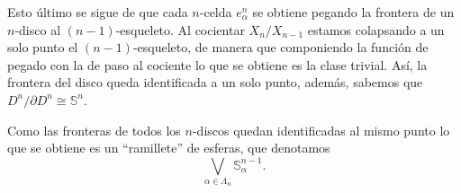 Esto último se sigue de que cada $n$-celda $e_{\alpha}^n$ se obtiene pegando la frontera de un $n$-disco al $(n-1)$-esqueleto. Al cocientar $X_n/X_{n-1}$ estamos colapsando a un solo punto el $(n-1)$-esqueleto, de manera que componiendo la función de pegado con la de paso al cociente lo que se obtiene es la clase trivial. Así, la frontera del disco queda identificada a un solo punto, además, sabemos que $D^n/\partial D^n \cong \mathbb{S}^n$.

Como las fronteras de todos los  $n$-discos quedan identificadas al mismo punto lo que se obtiene es un ``ramillete'' de esferas, que denotamos
\begin{equation*}
    \bigvee_{\alpha\in\Lambda_n} \mathbb{S}^{n-1}_{\alpha}.
\end{equation*}

\bigskip